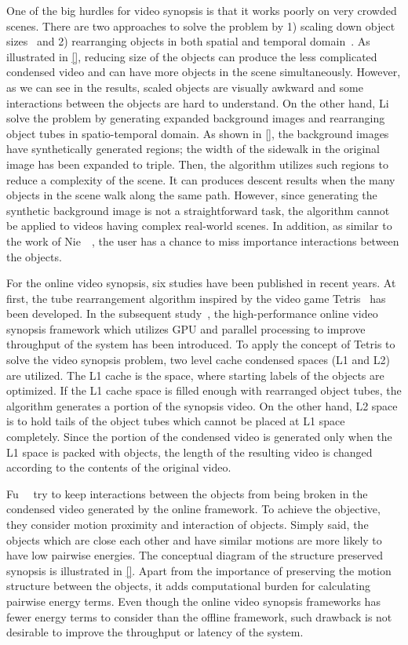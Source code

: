 \documentclass[11pt]{hyu_thesis}
\begin{document}
One of the big hurdles for video synopsis is that it works poorly on very crowded scenes. There are two approaches to solve the problem by 1) scaling down object sizes~\cite{Li2016} and 2) rearranging objects in both spatial and temporal domain~\cite{Nie2014}. As illustrated in \ref{}, reducing size of the objects can produce the less complicated condensed video and can have more objects in the scene simultaneously. However, as we can see in the results, scaled objects are visually awkward and some interactions between the objects are hard to understand. On the other hand, Li~\etal~\cite{Li2016} solve the problem by generating expanded background images and rearranging object tubes in spatio-temporal domain. As shown in \ref{}, the background images have synthetically generated regions; the width of the sidewalk in the original image has been expanded to triple. Then, the algorithm utilizes such regions to reduce a complexity of the scene. It can produces descent results when the many objects in the scene walk along the same path. However, since generating the synthetic background image is not a straightforward task, the algorithm cannot be applied to videos having complex real-world scenes. In addition, as similar to the work of Nie~\etal~\cite{Nie2014}, the user has a chance to miss importance interactions between the objects.

For the online video synopsis, six studies have been published in recent years. At first, the tube rearrangement algorithm inspired by the video game Tetris~\cite{ShikunFeng2012} has been developed. In the subsequent study~\cite{JianqingZhu2015}, the high-performance online video synopsis framework which utilizes GPU and parallel processing to improve throughput of the system has been introduced. To apply the concept of Tetris to solve the video synopsis problem, two level cache condensed spaces (L1 and L2) are utilized. The L1 cache is the space, where starting labels of the objects are optimized. If the L1 cache space is filled enough with rearranged object tubes, the algorithm generates a portion of the synopsis video. On the other hand, L2 space is to hold tails of the object tubes which cannot be placed at L1 space completely. Since the portion of the condensed video is generated only when the L1 space is packed with objects, the length of the resulting video is changed according to the contents of the original video.

Fu~\etal~\cite{Fu2014} try to keep interactions between the objects from being broken in the condensed video generated by the online framework. To achieve the objective, they consider motion proximity and interaction of objects. Simply said, the objects which are close each other and have similar motions are more likely to have low pairwise energies. The conceptual diagram of the structure preserved synopsis is illustrated in \ref{}. Apart from the importance of preserving the motion structure between the objects, it adds computational burden for calculating pairwise energy terms. Even though the online video synopsis frameworks has fewer energy terms to consider than the offline framework, such drawback is not desirable to improve the throughput or latency of the system.
\end{document}
